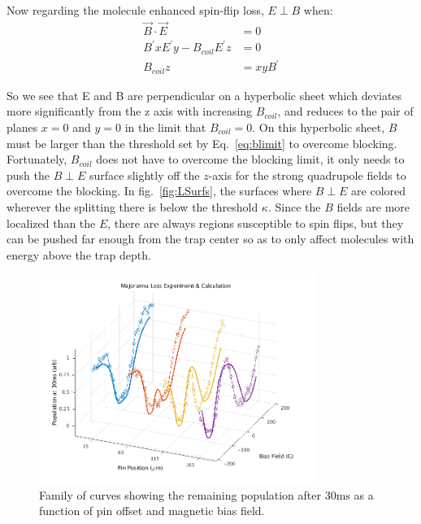 \documentclass[%
 reprint,
 amsmath,amssymb,
 aps,
prl,
]{revtex4-1}
\begin{document}
Now regarding the molecule enhanced spin-flip loss, $E\perp B$ when:
\begin{eqnarray}
\vec{B}\cdot \vec{E} &= 0\\
B^\prime x E^\prime y - B_{coil}  E^\prime z &= 0\\
B_{coil}z &= xyB^\prime
\end{eqnarray}

So we see that E and B are perpendicular on a hyperbolic sheet which deviates more significantly from the z axis with increasing $B_{coil}$, and reduces to the pair of planes $x=0$ and $y=0$ in the limit that $B_{coil} = 0$. On this hyperbolic sheet, $B$ must be larger than the threshold set by Eq.~\ref{eq:blimit} to overcome blocking. Fortunately, $B_{coil}$ does not have to overcome the blocking limit, it only needs to push the $B\perp E$ surface slightly off the $z$-axis for the strong  quadrupole fields to overcome the blocking. In fig.~\ref{fig:LSurfs}, the surfaces where $B\perp E$ are colored wherever the splitting there is below the threshold $\kappa$. Since the $B$ fields are more localized than the $E$, there are always regions susceptible to spin flips, but they can be pushed far enough from the trap center so as to only affect molecules with energy above the trap depth.

\begin{figure}
\includegraphics[width=90mm]{V-to-W-plot-3D-dave.png}%
\caption{
Family of curves showing the remaining population after $30 \text{ms}$ as a function of pin offset and magnetic bias field.
\label{fig:WVplot}}
\end{figure}
\end{document}
